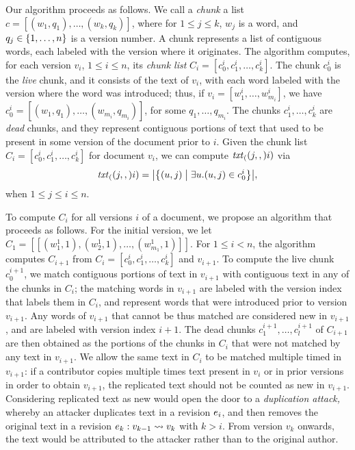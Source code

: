 Our algorithm proceeds as follows.
We call a {\em chunk\/} a list $c = [(w_1,q_1), \ldots, (w_k,q_k)]$,
where for $1 \leq j \leq k$, $w_j$ is a word,
and $q_j \in \left\{1, \ldots, n\right\}$ is a version number.
A chunk represents a list of contiguous words, each labeled with the
version where it originates.
The algorithm computes, for each version $v_i$, $1 \leq i \leq n$, its
{\em chunk list\/} $C_i = [c^i_0, c^i_1, \ldots, c^i_k]$.
The chunk $c^i_0$ is the {\em live\/} chunk, and it consists of the text
of $v_i$, with each word labeled with the version where the word was
introduced; thus, if $v_i = [w^i_1, \ldots, w^i_{m_i}]$,
we have $c^i_0 = [(w_1,q_1), \ldots, (w_{m_i},q_{m_i})]$,
for some $q_1, \ldots, q_{m_i}$.
The chunks $c^i_1, \ldots, c^i_k$ are {\em dead\/} chunks, and they
represent contiguous portions of text that used to be present in some
version of the document prior to $i$.
Given the chunk list $C_i = [c^i_0, c^i_1, \ldots, c^i_k]$ for
document $v_i$, we can compute $\mathit{txt}_{(}(j,,)i)$ via
%
\begin{equation} \label{eq-textlife}
  \txt(j,i) =
  \bigl|\bigl\{(u,j) \bigm| \exists u . (u,j) \in c^i_0\bigr\}\bigr|,
\end{equation}
%
when $1 \leq j \leq i \leq n$.

To compute $C_i$ for all versions $i$ of a document, we propose an
algorithm that proceeds as follows.
For the initial version, we let
$C_1 = [[(w^1_1, 1), (w^1_2, 1), \ldots, (w^1_{m_1}, 1)]]$.
For $1 \leq i < n$, the algorithm computes $C_{i+1}$ from
$C_i = [c^i_0, c^i_1, \ldots, c^i_k]$ and $v_{i+1}$.
To compute the live chunk $c^{i+1}_0$, we match contiguous portions of
text in $v_{i+1}$ with contiguous text in any of the chunks in $C_i$;
the matching words in $v_{i+1}$ are labeled with the version index that
labels them in $C_i$, and represent words that were introduced prior
to version $v_{i+1}$.
Any words of $v_{i+1}$ that cannot be thus matched are considered new
in $v_{i+1}$, and are labeled with version index $i+1$.
The dead chunks $c^{i+1}_1, \ldots, c^{i+1}_l$ of $C_{i+1}$ are then
obtained as the portions of the chunks in $C_i$ that were not matched
by any text in $v_{i+1}$.
%
We allow the same text in $C_i$ to be matched multiple timed in
$v_{i+1}$: if a contributor copies multiple times text present in
$v_i$ or in prior versions in order to obtain $v_{i+1}$, the
replicated text should not be counted as new in $v_{i+1}$.
Considering replicated text as new
would open the door to a {\em duplication attack,} whereby
an attacker duplicates text in a revision $e_{i}$, and then removes the
original text in a revision $e_{k}: v_{k-1} \rightsquigarrow v_k$ with $k > i$.
From version $v_k$ onwards, the text would be attributed to the
attacker rather than to the original author.

